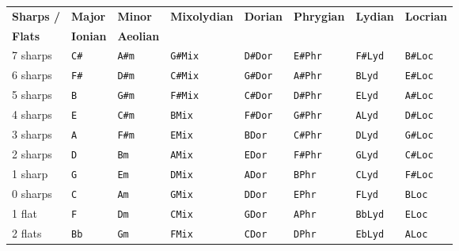 \documentclass[a4paper,fullpage,12pt]{book}
\begin{document}
\begin{table}[h]
\centering
\begin{tabular}{llllllll}
\toprule %
\textbf{Sharps /} & \textbf{Major} & \textbf{Minor} & \textbf{Mixolydian} &
\textbf{Dorian}  & \textbf{Phrygian} & \textbf{Lydian} & \textbf{Locrian} \\
\textbf{Flats}   & \textbf{Ionian} & \textbf{Aeolian} & ~ & ~ & ~ & ~ & ~ \\
\midrule %
7 sharps & \texttt{C\#} &  \texttt{A\#m} & \texttt{G\#Mix} &
\texttt{D\#Dor} & \texttt{E\#Phr} & \texttt{F\#Lyd} & \texttt{B\#Loc} \\

6 sharps & \texttt{F\#} &  \texttt{D\#m} & \texttt{C\#Mix} &
\texttt{G\#Dor} & \texttt{A\#Phr} & \texttt{BLyd}   & \texttt{E\#Loc} \\

5 sharps & \texttt{B}   &  \texttt{G\#m} & \texttt{F\#Mix} &
\texttt{C\#Dor} & \texttt{D\#Phr} & \texttt{ELyd}   & \texttt{A\#Loc} \\

4 sharps & \texttt{E}   &  \texttt{C\#m} & \texttt{BMix}   &
\texttt{F\#Dor} & \texttt{G\#Phr} & \texttt{ALyd}   & \texttt{D\#Loc} \\

3 sharps & \texttt{A}   &  \texttt{F\#m} & \texttt{EMix}   &
\texttt{BDor}   & \texttt{C\#Phr} & \texttt{DLyd}   & \texttt{G\#Loc} \\

2 sharps & \texttt{D}   &  \texttt{Bm}   & \texttt{AMix}   &
\texttt{EDor}   & \texttt{F\#Phr} & \texttt{GLyd}   & \texttt{C\#Loc} \\

1 sharp  & \texttt{G}   &  \texttt{Em}   & \texttt{DMix}   &
\texttt{ADor}   & \texttt{BPhr}   & \texttt{CLyd}   & \texttt{F\#Loc} \\

0 sharps & \texttt{C}   &  \texttt{Am}   & \texttt{GMix}   &
\texttt{DDor}   & \texttt{EPhr}   & \texttt{FLyd}   & \texttt{BLoc} \\

1 flat   & \texttt{F}   &  \texttt{Dm}   & \texttt{CMix}   &
\texttt{GDor}   & \texttt{APhr}   & \texttt{BbLyd}  & \texttt{ELoc} \\

2 flats  & \texttt{Bb}  &  \texttt{Gm}   & \texttt{FMix}   &
\texttt{CDor}   & \texttt{DPhr}   & \texttt{EbLyd}  & \texttt{ALoc} \\


\end{tabular}
\end{table}
\end{document}
